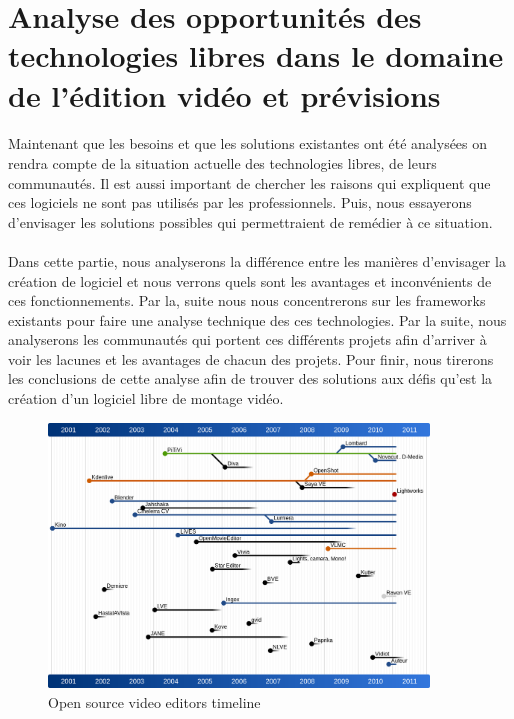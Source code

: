 \newpage \section{Analyse des opportunités des technologies libres dans
le domaine de l'édition vidéo et prévisions}

\paragraph{}
Maintenant que les besoins et que les solutions existantes
ont été analysées on rendra compte de la
situation actuelle des technologies libres, de leurs communautés. Il est
aussi important de chercher les raisons qui expliquent que ces
logiciels ne sont pas utilisés par les professionnels. Puis, nous essayerons
d'envisager les solutions possibles qui permettraient de remédier à ce
situation.

\paragraph{}
Dans cette partie, nous analyserons la différence entre les
manières d'envisager la création de logiciel et nous verrons quels sont les
avantages et inconvénients de ces fonctionnements. Par la, suite nous
nous concentrerons sur les frameworks existants pour faire une analyse
technique des ces technologies. Par la suite, nous analyserons
les communautés qui portent ces différents projets afin d'arriver à
voir les lacunes et les avantages de chacun des projets.  Pour finir,
nous tirerons les conclusions de cette analyse afin de trouver des
solutions aux défis qu'est la création d'un logiciel libre de montage
vidéo.

\newpage
\begin{figure}
  \begin{center}
    \includegraphics[width=0.9\textwidth]{images/open-source-video-editor-timeline}
  \end{center} \caption{Open source video editors timeline} \label{Yes}
\end{figure}

